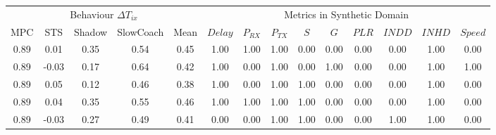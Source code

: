 \begin{tabular}{|*{5}{c|}|*{9}{c|}}
\toprule
\multicolumn{5}{|c||}{Behaviour $\Delta T_{ix}$} & \multicolumn{9}{c|}{Metrics in Synthetic Domain}\\
               MPC &   STS & Shadow & SlowCoach & Mean &                     $Delay$ & $P_{RX}$ & $P_{TX}$ &  $S$ &  $G$ & $PLR$ & $INDD$ & $INHD$ & $Speed$ \\
\midrule
              0.89 &  0.01 &   0.35 &      0.54 & 0.45 &                        1.00 &     1.00 &     1.00 & 0.00 & 0.00 &  0.00 &   0.00 &   1.00 &    0.00 \\
              0.89 & -0.03 &   0.17 &      0.64 & 0.42 &                        1.00 &     0.00 &     1.00 & 0.00 & 1.00 &  0.00 &   0.00 &   1.00 &    1.00 \\
              0.89 &  0.05 &   0.12 &      0.46 & 0.38 &                        1.00 &     0.00 &     1.00 & 1.00 & 0.00 &  0.00 &   0.00 &   1.00 &    0.00 \\
              0.89 &  0.04 &   0.35 &      0.55 & 0.46 &                        1.00 &     1.00 &     1.00 & 1.00 & 0.00 &  0.00 &   0.00 &   1.00 &    0.00 \\
              0.89 & -0.03 &   0.27 &      0.49 & 0.41 &                        0.00 &     0.00 &     1.00 & 1.00 & 0.00 &  0.00 &   1.00 &   1.00 &    0.00 \\
\bottomrule
\end{tabular}
